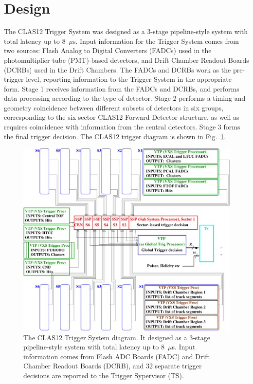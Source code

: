 \section{Design}

The CLAS12 Trigger System was designed as a 3-stage pipeline-style system with total latency up to 8~$\mu$s. Input information for the Trigger System comes from two sources:  Flash Analog to Digital Converters (FADCs) used in the photomultiplier tube (PMT)-based detectors, and Drift Chamber Readout Boards (DCRBs) used in the Drift Chambers. The FADCs and DCRBs work as the pre-trigger level, reporting information to the Trigger System in the appropriate form. Stage 1 receives information from the FADCs and DCRBs, and performs data processing according to the type of detector. Stage 2 performs a timing and geometry coincidence between different subsets of detectors in six groups, corresponding to the six-sector CLAS12 Forward Detector structure, as well as requires coincidence with information from the central detectors. Stage 3 forms the final trigger decision. The CLAS12 trigger diagram is shown in Fig.~\ref{fig:TriggerDiagram}.

\begin{figure}[hbt]
	\centering
	\includegraphics[width=1.0\columnwidth,keepaspectratio]{img/CLAS12_TRIGGER_1.pdf}
	\caption{The CLAS12 Trigger System diagram. It designed as a 3-stage pipeline-style system with total latency up to 8~$\mu$s. Input information comes from Flash ADC Boards (FADC) and Drift Chamber Readout Boards (DCRB), and 32 separate trigger decisions are reported to the Trigger Sypervisor (TS). }
	\label{fig:TriggerDiagram}
\end{figure}


